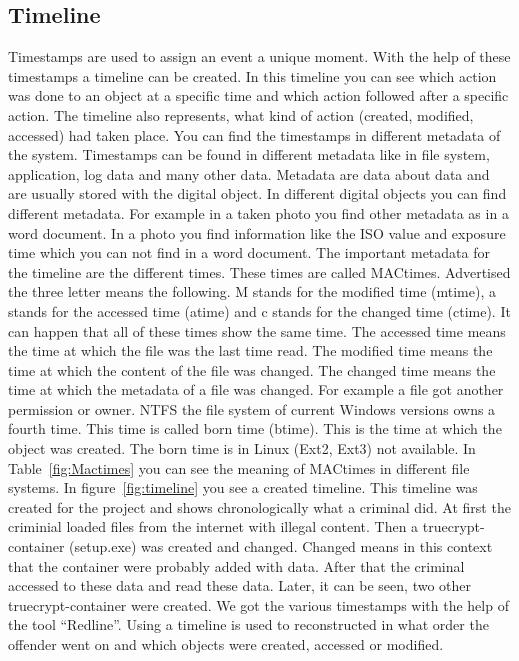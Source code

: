 
\subsection{Timeline}

Timestamps are used to assign an event a unique moment. With the help of these timestamps a timeline can be created. In this timeline you can see which action was done to an object at a specific time and which action followed after a specific action. The timeline also  represents, what kind of action (created, modified, accessed) had taken place. You can find the timestamps in different metadata of the system. Timestamps can be found in different metadata like in file system, application, log data and many other data. Metadata are data about data and are usually stored with the digital object. In different digital objects you can find different metadata. For example in a taken photo you find other metadata as in a word document. In a photo you find information like the ISO value and exposure time which you can not find in a word document. The important metadata for the timeline are the different times. These times are called MACtimes. Advertised the three letter means the following. M stands for the modified time (mtime), a  stands for the accessed time (atime) and c stands for the changed time (ctime). It can happen that all of these times show the same time. The accessed time means the time at which the file was the last time read. The modified time means the time at which the content of the file was changed. The changed time means the time at which the metadata of a file was changed. For example a file got another permission or owner. NTFS the file system of current Windows versions owns a fourth time. This time is called born time (btime). This is the time at which the object was created. The born time is in Linux (Ext2, Ext3) not available. In Table~\ref{fig:Mactimes} you can see the meaning of MACtimes in different file systems. In figure~\ref{fig:timeline} you see a created timeline. This timeline was created for the project and shows chronologically what a criminal did. At first the criminial loaded files from the internet with illegal content. Then a truecrypt-container (setup.exe) was created and changed. Changed means in this context that the container were probably added with data. After that the criminal accessed to these data and read these data. Later, it can be seen, two other truecrypt-container were created. We got the various timestamps with the help of the tool “Redline”. Using a timeline is used to reconstructed in what order the offender went on and which objects were created, accessed or modified.

